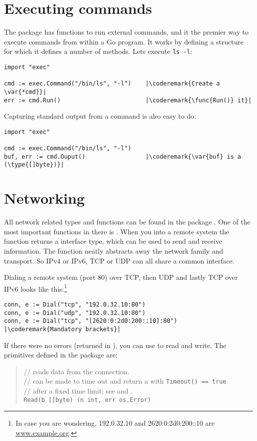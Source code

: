 \section{Executing commands}
The  package has functions to run external commands, and it the premier way to
execute commands from within a Go program. It works by defining a  structure for which it
defines a number of methods.
Lets execute \verb|ls -l|:
\begin{lstlisting}
import "exec"

cmd := exec.Command("/bin/ls", "-l")    |\coderemark{Create a \var{*cmd}}|
err := cmd.Run()                        |\coderemark{\func{Run()} it}|
\end{lstlisting}
Capturing standard output from a command is also easy to do:
\begin{lstlisting}
import "exec"

cmd := exec.Command("/bin/ls", "-l")
buf, err := cmd.Ouput()                 |\coderemark{\var{buf} is a (\type{[]byte})}|
\end{lstlisting}

\section{Networking}
All network related types and functions can be found in the package . One of the
most important functions in there is . When you 
into a remote system the function returns a  interface type, which can be used
to send and receive information. The function  neatly abstracts away the network
family and transport. So IPv4 or IPv6, TCP or UDP can all share a common interface. 

Dialing a remote system (port 80) over TCP, then UDP and lastly TCP over IPv6 looks
like this:\footnote{In case
you are wondering, 192.0.32.10 and 2620:0:2d0:200::10 are \url{www.example.org}.}
\begin{lstlisting}
conn, e := Dial("tcp", "192.0.32.10:80")
conn, e := Dial("udp", "192.0.32.10:80")
conn, e := Dial("tcp", "[2620:0:2d0:200::10]:80") |\coderemark{Mandatory brackets}|
\end{lstlisting}

If there were no errors (returned in ), you can use  to read and write.
The primitives defined in the package  are:
\begin{quote}
//  reads data from the connection.\\
//  can be made to time out and return a  with \lstinline{Timeout() == true}\\
// after a fixed time limit; see  and .\\
\lstinline{Read(b []byte) (n int, err os.Error)}
\end{quote}

